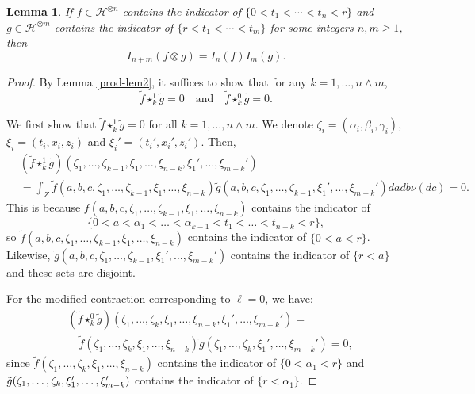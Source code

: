 \documentclass[12pt]{article}
\newtheorem{lemma}[theorem]{Lemma}
\def\cH{\mathcal{H}}
\begin{document}
\begin{lemma}
\label{prod-lem} 
 If $f \in \cH^{\otimes n}$ contains the indicator of $\{0 < t_1 < \cdots < t_n < r \}$ and $g \in \cH^{\otimes m}$ contains the indicator of $\{r < t_1 < \cdots < t_m \}$ for some integers $n,m \geq 1$, then
\[
I_{n+m}(f\otimes g)=I_{n}(f) I_{m}(g).
\]
\end{lemma}


\begin{proof} By Lemma \ref{prod-lem2}, it suffices to show that for any $k=1,\ldots,n\wedge m$,
\[
\tilde{f} \star_k^1 \tilde{g}=0 \quad \mbox{and} \quad \tilde{f} \star_k^0 \tilde{g}=0.
\]


We first show that $\tilde{f} \star_k^1 \tilde{g}=0$ for all $k=1,\ldots,n\wedge m$. We denote $\zeta_i=(\alpha_i,\beta_i,\gamma_i)$, $\xi_i=(t_i,x_i,z_i)$ and  $\xi_i'=(t_i',x_i',z_i')$. Then,
\begin{align*}
& (\tilde{f} \star_k^1 \tilde{g})(\zeta_1,\ldots,\zeta_{k-1},\xi_1,\ldots,\xi_{n-k},\xi_1',\ldots,\xi_{m-k}')\\
& = \int_{Z} \tilde{f}(a,b,c,\zeta_1,\ldots,\zeta_{k-1},\xi_1,\ldots,\xi_{n-k})
\tilde{g}(a,b,c,\zeta_1,\ldots,\zeta_{k-1},\xi_1',\ldots,\xi_{m-k}')da db \nu(dc)=0.
\end{align*}
This is because $f(a,b,c,\zeta_1,\ldots,\zeta_{k-1},\xi_1,\ldots,\xi_{n-k})$ contains the indicator of
\[
\{0<a<\alpha_1<\ldots< \alpha_{k-1}<t_1<\ldots<t_{n-k}<r\},
\]
so $\tilde{f}(a,b,c,\zeta_1,\ldots,\zeta_{k-1},\xi_1,\ldots,\xi_{n-k})$ contains the indicator of $\{0 < a < r\}$. Likewise, $\tilde{g}(a,b,c,\zeta_1,\ldots,\zeta_{k-1},\xi_1',\ldots,\xi_{m-k}')$ contains the indicator of $\{r<a\}$ and these sets are disjoint.

For the modified contraction corresponding to $\ell=0$, we have:
\begin{align*}
& (\tilde{f} \star_k^0 \tilde{g})(\zeta_1,\ldots,\zeta_{k},\xi_1,\ldots,\xi_{n-k},\xi_1',\ldots,\xi_{m-k}')=\\
& \quad  \tilde{f}(\zeta_1,\ldots,\zeta_{k},\xi_1,\ldots,\xi_{n-k})
\tilde{g}(\zeta_1,\ldots,\zeta_{k},\xi_1',\ldots,\xi_{m-k}')=0,
\end{align*}
since $\tilde{f}(\zeta_1,\ldots,\zeta_{k},\xi_1,\ldots,\xi_{n-k})$ contains the indicator of
$\{0<\alpha_1<r\}$ and $\tilde{g}(\zeta_1,\ldots,\zeta_{k},\linebreak \xi_1',\ldots,\xi_{m-k}')$ contains the indicator of $\{r<\alpha_1\}$.
\end{proof}
\end{document}
